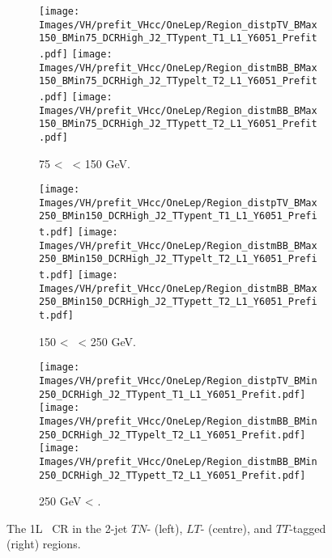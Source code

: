 \newpage
\vspace*{\fill} 


\begin{figure}[h!]
    \centering
    \begin{subfigure}[b]{\textwidth}
        \centering
        \texttt{[image: Images/VH/prefit\_VHcc/OneLep/Region\_distpTV\_BMax150\_BMin75\_DCRHigh\_J2\_TTypent\_T1\_L1\_Y6051\_Prefit.pdf]}
        \texttt{[image: Images/VH/prefit\_VHcc/OneLep/Region\_distmBB\_BMax150\_BMin75\_DCRHigh\_J2\_TTypelt\_T2\_L1\_Y6051\_Prefit.pdf]}
        \texttt{[image: Images/VH/prefit\_VHcc/OneLep/Region\_distmBB\_BMax150\_BMin75\_DCRHigh\_J2\_TTypett\_T2\_L1\_Y6051\_Prefit.pdf]}
        \caption{75 < \ptv\ < 150 GeV.}
        \label{fig:plots_VHcc_1L_75_CRH_2J}
    \end{subfigure}
    \begin{subfigure}[b]{\textwidth}
        \centering
        \texttt{[image: Images/VH/prefit\_VHcc/OneLep/Region\_distpTV\_BMax250\_BMin150\_DCRHigh\_J2\_TTypent\_T1\_L1\_Y6051\_Prefit.pdf]}
        \texttt{[image: Images/VH/prefit\_VHcc/OneLep/Region\_distmBB\_BMax250\_BMin150\_DCRHigh\_J2\_TTypelt\_T2\_L1\_Y6051\_Prefit.pdf]}
        \texttt{[image: Images/VH/prefit\_VHcc/OneLep/Region\_distmBB\_BMax250\_BMin150\_DCRHigh\_J2\_TTypett\_T2\_L1\_Y6051\_Prefit.pdf]}
        \caption{150 < \ptv\ < 250 GeV.}
        \label{fig:plots_VHcc_1L_150_CRH_2J}
    \end{subfigure}
    \begin{subfigure}[b]{\textwidth}
        \centering
        \texttt{[image: Images/VH/prefit\_VHcc/OneLep/Region\_distpTV\_BMin250\_DCRHigh\_J2\_TTypent\_T1\_L1\_Y6051\_Prefit.pdf]}
        \texttt{[image: Images/VH/prefit\_VHcc/OneLep/Region\_distmBB\_BMin250\_DCRHigh\_J2\_TTypelt\_T2\_L1\_Y6051\_Prefit.pdf]}
        \texttt{[image: Images/VH/prefit\_VHcc/OneLep/Region\_distmBB\_BMin250\_DCRHigh\_J2\_TTypett\_T2\_L1\_Y6051\_Prefit.pdf]}
        \caption{250 GeV < \ptv.}
        \label{fig:plots_VHcc_1L_250_CRH_2J}
    \end{subfigure}
    \caption{The 1L \highdr\ CR in the 2-jet $TN$- (left), $LT$- (centre), and $TT$-tagged (right) regions.}
    \label{fig:plots_VHcc_1L_CRH_2J}
\end{figure}

\vspace*{\fill} \newpage
\vspace*{\fill} 

